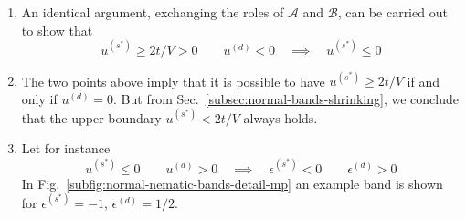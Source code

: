 \begin{enumerate}
	From Eq.~\eqref{eq:BZ-A-def}, $\forall \mathbf{k} \in \mathcal{A}$ the form factors $\cos k_x \pm \cos k_y$ are positive by construction. By hypothesis $\epsilon^{(s^*)} \ge 0$ and $\epsilon^{(d)} > 0$. Hence:
	\[
	\forall \mathbf{k} \in \mathcal{A}
	\quad\colon\quad
	\begin{aligned}
		\tilde{\epsilon}_\mathbf{k} &= \overbrace{\epsilon^{(s^*)} \left( \cos k_x + \cos k_y \right)}^{\ge 0} + \overbrace{\epsilon^{(d)}  \left( \cos k_x - \cos k_y \right) }^{\ge 0} \\
		\tilde{\epsilon}_{\mathcal{R}\mathbf{k}} &= \underbrace{\epsilon^{(s^*)} \left( \cos k_x + \cos k_y \right)}_{\ge 0} - \underbrace{\epsilon^{(d)}  \left( \cos k_x - \cos k_y \right) }_{\ge 0}
	\end{aligned}
	\]
	Summing the two equations above we have:
	\[
	\forall \mathbf{k} \in \mathcal{A}
	\quad\colon\quad
	\tilde{\epsilon}_\mathbf{k} + \tilde{\epsilon}_{\mathcal{R}\mathbf{k}} \ge 0
	\]
	thus $\tilde{\epsilon}_\mathbf{k} \ge -\tilde{\epsilon}_{\mathcal{R}\mathbf{k}}$.	The Fermi-Dirac distribution is monotonically descendent. Then:
	\[
	\forall \mathbf{k} \in \mathcal{A}
	\quad\colon\quad
	\begin{aligned}
		f(\tilde{\epsilon}_\mathbf{k};\beta,\tilde{\mu}) &\le f(-\tilde{\epsilon}_{\mathcal{R}\mathbf{k}};\beta,\tilde{\mu}) \\
		f(-\tilde{\epsilon}_\mathbf{k};\beta,\tilde{\mu}) &\ge f(\tilde{\epsilon}_{\mathcal{R}\mathbf{k}};\beta,\tilde{\mu}) 
	\end{aligned}
	\]
	This condition, inserted in Eq.~\eqref{eq:normal-us*-AR}, leads to an absurd:
	\[
	u^{(s^*)} \ge 2t/V \qquad
	u^{(d)} > 0
	\quad\implies\quad
	u^{(s^*)} \le 0
	\]
	\item An identical argument, exchanging the roles of $\mathcal{A}$ and $\mathcal{B}$, can be carried out to show that
	\[
	u^{(s^*)} \ge 2t/V > 0
	\qquad
	u^{(d)} < 0
	\quad\implies\quad
	u^{(s^*)} \le 0
	\]
	\item The two points above imply that it is possible to have $u^{(s^*)} \ge 2t/V$ if and only if $u^{(d)}=0$. But from Sec.~\ref{subsec:normal-bands-shrinking}, we conclude that the upper boundary $u^{(s^*)} < 2t/V$ always holds.
	\item Let for instance
	\[
	u^{(s^*)} \le 0
	\qquad
	u^{(d)} > 0
	\quad\implies\quad
	\epsilon^{(s^*)} < 0
	\qquad
	\epsilon^{(d)} > 0
	\]
	In Fig.~\ref{subfig:normal-nematic-bands-detail-mp} an example band is shown for $\epsilon^{(s^*)}=-1$, $\epsilon^{(d)}=1/2$.
	

\end{enumerate}

